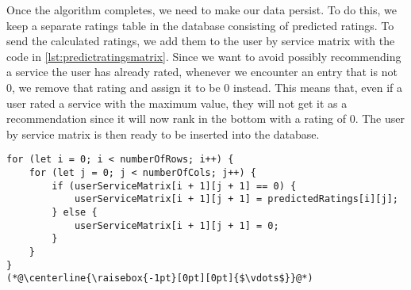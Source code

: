 Once the algorithm completes, we need to make our data persist.
To do this, we keep a separate ratings table in the database consisting of predicted ratings.
To send the calculated ratings, we add them to the user by service matrix with the code in \autoref{lst:predictratingsmatrix}.
Since we want to avoid possibly recommending a service the user has already rated, whenever we encounter an entry that is not 0, we remove that rating and assign it to be 0 instead.
This means that, even if a user rated a service with the maximum value, they will not get it as a recommendation since it will now rank in the bottom with a rating of 0.
The user by service matrix is then ready to be inserted into the database.
\begin{lstlisting}[caption={Adding the predictions to the ratings matrix}, captionpos=b, label={lst:predictratingsmatrix}]
for (let i = 0; i < numberOfRows; i++) {
    for (let j = 0; j < numberOfCols; j++) {
        if (userServiceMatrix[i + 1][j + 1] == 0) {
            userServiceMatrix[i + 1][j + 1] = predictedRatings[i][j];
        } else {
            userServiceMatrix[i + 1][j + 1] = 0;
        }
    }
}
(*@\centerline{\raisebox{-1pt}[0pt][0pt]{$\vdots$}}@*)
\end{lstlisting}

